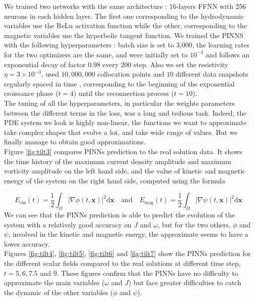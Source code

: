 \documentclass[12pt,openany]{amsbook}
\newcommand{\bbm}[1]{{\mathbf{#1}}}
\begin{document}
We trained two networks with the same architecture :  16-layers FFNN with 256 neurons
in each hidden layer. The first one corresponding to the hydrodynamic variables use the ReLu activation function 
while the other, corresponding to the magnetic variables use the hyperbolic tangent function. 
We trained the PINNS with the following hyperparameters : batch size is set to 3,000, the learning rates 
for the two optimizers are the same, and were initially set to $10^{-3}$ and follows an exponential decay of factor $0.98$ every $200$ step.
Also we set the resistivity $\eta = 3\times 10^{-3}$, used $10,000,000$ collocation points and $10$ different data snapshots 
regularly spaced in time , corresponding to  
the beginning of the exponential croissance phase ($t = 4$) until the reconnection process ($t=10$).\\

The tuning of all the hyperparameters, in particular the weights parameters between the different terms in the loss, 
was a long and tedious task. 
Indeed, the PDE system we look is highly non-linear, the functions we want to approximate take complex shapes that evolve a lot, and 
take wide range of values. But we finally manage to obtain good approximations.\\

Figure \ref{fig:tilt3} compares PINNs prediction to the real solution data. 
It shows the time history of the maximum current density amplitude and maximum vorticity amplitude on the 
left hand side, and the value of kinetic and magnetic energy of the system on the right hand side, computed using the formula 

\begin{equation}
    E_{\text{cin}}(t) = \frac{1}{2} \int_\Omega |\nabla \phi(t,\bbm x) | ^2 \mathrm{d}\bbm x \quad  
    \text{and} \quad E_{\text{mag}}(t) = \frac{1}{2} \int_\Omega |\nabla \psi (t,\bbm x)| ^2 \mathrm{d}\bbm x
\end{equation}
We can see that the PINNs prediction is able to predict the evolution of the system with a relatively good accuracy on $J$ and $\omega$, 
but for the two others, $\phi$ and $\psi$, involved in the kinetic and magnetic energy, the approximate seems to have a lower accuracy.\\

Figures \ref{fig:tilt4}, \ref{fig:tilt5}, \ref{fig:tilt6} and \ref{fig:tilt7} show 
the PINNs prediction for the different scalar fields compared to the real solutions at 
different time step, $t=5, 6, 7.5$ and $9$. These figures confirm that the PINNs have no difficulty to approximate the 
main variables ($\omega$ and $J$) but face greater difficulties to catch the dynamic of the other variables ($\phi$ and $\psi$).\\
\end{document}
